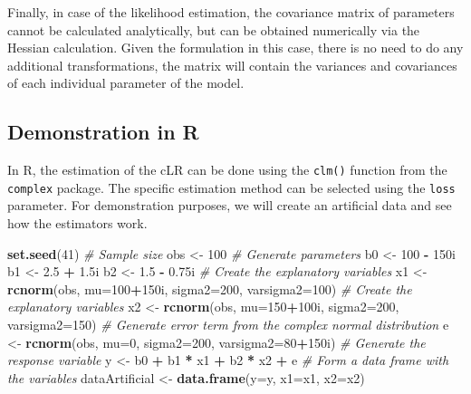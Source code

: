 \documentclass[
]{book}
\newenvironment{Shaded}{\begin{snugshade}}{\end{snugshade}}
\newcommand{\CommentTok}[1]{\textcolor[rgb]{0.56,0.35,0.01}{\textit{#1}}}
\newcommand{\DataTypeTok}[1]{\textcolor[rgb]{0.13,0.29,0.53}{#1}}
\newcommand{\DecValTok}[1]{\textcolor[rgb]{0.00,0.00,0.81}{#1}}
\newcommand{\FloatTok}[1]{\textcolor[rgb]{0.00,0.00,0.81}{#1}}
\newcommand{\KeywordTok}[1]{\textcolor[rgb]{0.13,0.29,0.53}{\textbf{#1}}}
\newcommand{\NormalTok}[1]{#1}
\newcommand{\OperatorTok}[1]{\textcolor[rgb]{0.81,0.36,0.00}{\textbf{#1}}}
\newcommand{\StringTok}[1]{\textcolor[rgb]{0.31,0.60,0.02}{#1}}
\begin{document}
Finally, in case of the likelihood estimation, the covariance matrix of parameters cannot be calculated analytically, but can be obtained numerically via the Hessian calculation. Given the formulation in this case, there is no need to do any additional transformations, the matrix will contain the variances and covariances of each individual parameter of the model.

\hypertarget{demonstration-in-r}{%
\subsection{Demonstration in R}\label{demonstration-in-r}}

In R, the estimation of the cLR can be done using the \texttt{clm()} function from the \texttt{complex} package. The specific estimation method can be selected using the \texttt{loss} parameter. For demonstration purposes, we will create an artificial data and see how the estimators work.

\begin{Shaded}
\begin{Highlighting}[]
\KeywordTok{set.seed}\NormalTok{(}\DecValTok{41}\NormalTok{)}
\CommentTok{\# Sample size}
\NormalTok{obs \textless{}{-}}\StringTok{ }\DecValTok{100}
\CommentTok{\# Generate parameters}
\NormalTok{b0 \textless{}{-}}\StringTok{ }\DecValTok{100} \OperatorTok{{-}}\StringTok{ }\NormalTok{150i}
\NormalTok{b1 \textless{}{-}}\StringTok{ }\FloatTok{2.5} \OperatorTok{+}\StringTok{ }\FloatTok{1.5}\NormalTok{i}
\NormalTok{b2 \textless{}{-}}\StringTok{ }\FloatTok{1.5} \OperatorTok{{-}}\StringTok{ }\FloatTok{0.75}\NormalTok{i}
\CommentTok{\# Create the explanatory variables}
\NormalTok{x1 \textless{}{-}}\StringTok{ }\KeywordTok{rcnorm}\NormalTok{(obs, }\DataTypeTok{mu=}\DecValTok{100}\OperatorTok{+}\NormalTok{150i, }\DataTypeTok{sigma2=}\DecValTok{200}\NormalTok{, }\DataTypeTok{varsigma2=}\DecValTok{100}\NormalTok{)}
\CommentTok{\# Create the explanatory variables}
\NormalTok{x2 \textless{}{-}}\StringTok{ }\KeywordTok{rcnorm}\NormalTok{(obs, }\DataTypeTok{mu=}\DecValTok{150}\OperatorTok{+}\NormalTok{100i, }\DataTypeTok{sigma2=}\DecValTok{200}\NormalTok{, }\DataTypeTok{varsigma2=}\DecValTok{150}\NormalTok{)}
\CommentTok{\# Generate error term from the complex normal distribution}
\NormalTok{e \textless{}{-}}\StringTok{ }\KeywordTok{rcnorm}\NormalTok{(obs, }\DataTypeTok{mu=}\DecValTok{0}\NormalTok{, }\DataTypeTok{sigma2=}\DecValTok{200}\NormalTok{, }\DataTypeTok{varsigma2=}\DecValTok{80}\OperatorTok{+}\NormalTok{150i)}
\CommentTok{\# Generate the response variable}
\NormalTok{y \textless{}{-}}\StringTok{ }\NormalTok{b0 }\OperatorTok{+}\StringTok{ }\NormalTok{b1 }\OperatorTok{*}\StringTok{ }\NormalTok{x1 }\OperatorTok{+}\StringTok{ }\NormalTok{b2 }\OperatorTok{*}\StringTok{ }\NormalTok{x2 }\OperatorTok{+}\StringTok{ }\NormalTok{e}
\CommentTok{\# Form a data frame with the variables}
\NormalTok{dataArtificial \textless{}{-}}\StringTok{ }\KeywordTok{data.frame}\NormalTok{(}\DataTypeTok{y=}\NormalTok{y, }\DataTypeTok{x1=}\NormalTok{x1, }\DataTypeTok{x2=}\NormalTok{x2)}
\end{Highlighting}
\end{Shaded}
\end{document}
